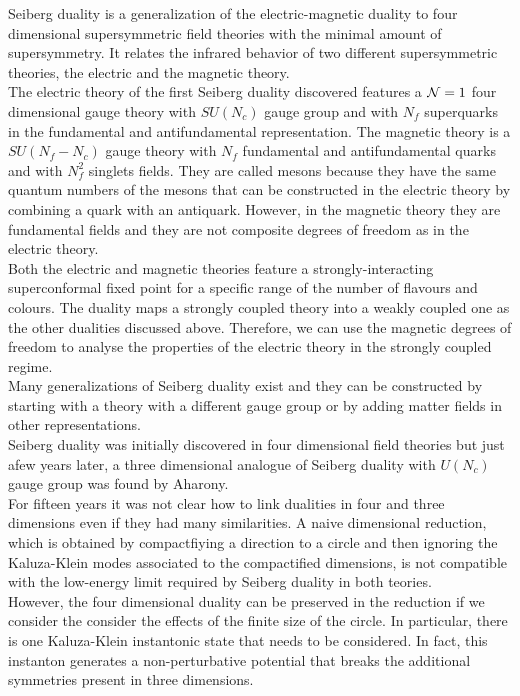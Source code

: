 Seiberg duality is a generalization of the electric-magnetic duality to four dimensional supersymmetric field theories with the minimal amount of supersymmetry.
It relates the infrared behavior of two different supersymmetric theories, the electric and the magnetic theory.\\
The electric theory of the first Seiberg duality discovered features a $\mathcal{N}=1$ four dimensional gauge theory with $SU(N_c)$ gauge group and with $N_f$ superquarks in the fundamental and antifundamental representation.
The magnetic theory is a $SU(N_f-N_c)$ gauge theory with $N_f$ fundamental and antifundamental quarks and with $N_f^2$ singlets fields. 
They are called mesons because they have the same quantum numbers of the mesons that can be constructed in the electric theory by combining a quark with an antiquark. 
However, in the magnetic theory they are fundamental fields and they are not composite degrees of freedom as in the electric theory.\\
Both the electric and magnetic theories feature a strongly-interacting superconformal fixed point for a specific range of the number of flavours and colours. 
The duality maps a strongly coupled theory into a weakly coupled one as the other dualities discussed above. 
Therefore, we can use the magnetic degrees of freedom to analyse the properties of the electric theory in the strongly coupled regime.\\
Many generalizations of Seiberg duality exist and they can be constructed by starting with a theory with a different gauge group or by adding matter fields in other representations.
\\
Seiberg duality was initially discovered in four dimensional field theories but just afew years later, a three dimensional analogue of Seiberg duality with $U(N_c)$ gauge group was found by Aharony.\\

For fifteen years it was not clear how to link dualities in four and three dimensions even if they had many similarities. 
A naive dimensional reduction, which is obtained by compactfiying a direction to a circle and then ignoring the Kaluza-Klein modes associated to the compactified dimensions, is not compatible with the low-energy limit required by Seiberg duality in both teories.  \\
However, the four dimensional duality can be preserved in the reduction if we consider the consider the effects of the finite size of the circle.
In particular, there is one Kaluza-Klein instantonic state that needs to be considered.
In fact, this instanton generates a non-perturbative potential that breaks the additional symmetries present in three dimensions.






